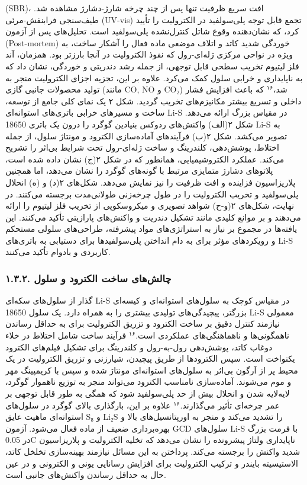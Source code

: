 \documentclass[12pt,a4paper,twocolumn]{article} %
\newcommand{\persian}[1]{\textfarsi{#1}}
\newcommand{\english}[1]{\textenglish{#1}}
\begin{document}
\persian{
(\english{SBR})، افت سریع ظرفیت تنها پس از چند چرخه شارژ-دشارژ مشاهده شد. طیف‌سنجی فرابنفش-مرئی (\english{UV-vis}) تجمع قابل توجه پلی‌سولفید در الکترولیت را تأیید کرد، که نشان‌دهنده وقوع شاتل کنترل‌نشده پلی‌سولفید است. تحلیل‌های پس از آزمون (\english{Post-mortem}) خوردگی شدید کاتد و اتلاف موضعی ماده فعال را آشکار ساخت، به ویژه در نواحی مرکزی ژله‌ای-رول که نفوذ الکترولیت در آنجا بارزتر بود. همزمان، آند فلز لیتیوم تخریب سطحی قابل توجهی، از جمله رشد دندریتی و خوردگی، نشان داد که به ناپایداری و خرابی سلول کمک می‌کرد. علاوه بر این، تجزیه اجزای الکترولیت منجر به تولید محصولات جانبی گازی (مانند \english{CO}, \english{NO} و \english{CO₂}) شد،$^{۱۶}$ که باعث افزایش فشار داخلی و تسریع بیشتر مکانیزم‌های تخریب گردید.
}
\persian{
شکل ۲ یک نمای کلی جامع از توسعه، ساخت و مسیرهای خرابی باتری‌های استوانه‌ای \english{Li-S} در مقیاس بزرگ ارائه می‌دهد. شکل ۲(الف) واکنش‌های ردوکس بنیادین گوگرد را درون یک باتری \english{18650 Li-S} به تصویر می‌کشد. شکل ۲(ب) فرآیندهای آماده‌سازی الکترود و مونتاژ سلول، از جمله اختلاط، پوشش‌دهی، کلندرینگ و ساخت ژله‌ای-رول تحت شرایط بی‌اثر را تشریح می‌کند. عملکرد الکتروشیمیایی، همانطور که در شکل ۲(ج) نشان داده شده است، پلاتوهای دشارژ متمایزی مرتبط با گونه‌های گوگرد را نشان می‌دهد، اما همچنین پلاریزاسیون فزاینده و افت ظرفیت را نیز نمایش می‌دهد. شکل‌های ۲(د) و (ه) انحلال پلی‌سولفید و تخریب الکترولیت را در طول چرخه‌زنی طولانی‌مدت برجسته می‌کنند. در نهایت، شکل‌های ۲(و-ح) شواهد تصویری و میکروسکوپی از تخریب فلز لیتیوم را ارائه می‌دهند و بر موانع کلیدی مانند تشکیل دندریت و واکنش‌های پارازیتی تأکید می‌کنند. این یافته‌ها در مجموع بر نیاز به استراتژی‌های مواد پیشرفته، طراحی‌های سلولی مستحکم و رویکردهای مؤثر برای به دام انداختن پلی‌سولفیدها برای دستیابی به باتری‌های \english{Li-S} کاربردی و بادوام تأکید می‌کنند.
}
\subsubsection*{\persian{۱.۳.۲. چالش‌های ساخت الکترود و سلول}}
\persian{
گذار از سلول‌های سکه‌ای \english{Li-S} در مقیاس کوچک به سلول‌های استوانه‌ای و کیسه‌ای بزرگتر، پیچیدگی‌های تولیدی بیشتری را به همراه دارد. یک سلول \english{18650 Li-S} معمولی نیازمند کنترل دقیق بر ساخت الکترود و تزریق الکترولیت برای به حداقل رساندن ناهمگونی‌ها و ناهماهنگی‌های عملکردی است.$^{۱۶}$ فرآیند ساخت شامل اختلاط در خلاء دوغاب کاتد، پوشش‌دهی رول-به-رول و کلندرینگ برای تشکیل فیلم‌های الکترود یکنواخت است. سپس الکترودها از طریق پیچیدن، شیارزنی و تزریق الکترولیت در یک محیط پر از آرگون بی‌اثر به سلول‌های استوانه‌ای مونتاژ شده و سپس با کریمپینگ مهر و موم می‌شوند. آماده‌سازی نامناسب الکترود می‌تواند منجر به توزیع ناهموار گوگرد، لایه‌لایه شدن و انحلال بیش از حد پلی‌سولفید شود که همگی به طور قابل توجهی بر عمر چرخه‌ای تأثیر می‌گذارند.$^{۱۶}$ علاوه بر این، بارگذاری بالای گوگرد در سلول‌های استوانه‌ای ماهیت عایق \english{S₈} و \english{Li₂S} را تشدید می‌کند و منجر به اورپتانسیل‌های بالا و بهره‌برداری ضعیف از ماده فعال می‌شود. آزمون \english{GCD} سلول‌های \english{Li-S} با فرمت بزرگ در \english{0.05C} ناپایداری ولتاژ پیشرونده را نشان می‌دهد که تخلیه الکترولیت و پلاریزاسیون شدید واکنش را برجسته می‌کند. پرداختن به این مسائل نیازمند بهینه‌سازی تخلخل کاتد، الاستیسیته بایندر و ترکیب الکترولیت برای افزایش رسانایی یونی و الکترونی و در عین حال به حداقل رساندن واکنش‌های جانبی است.
}
\end{document}
